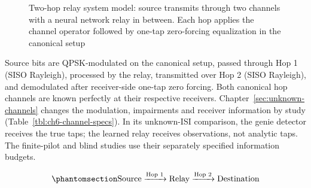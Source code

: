 \begin{figure}[htbp]
\centering
{}
\caption[Two-hop relay system model]{Two-hop relay system model: source transmits through two channels with a neural network relay in between. Each hop applies the channel operator followed by one-tap zero-forcing equalization in the canonical setup}
\label{fig:relay-system-simple}
\end{figure}

Source bits are QPSK-modulated on the canonical setup, passed through Hop 1 (SISO Rayleigh), processed by the relay, transmitted over Hop 2 (SISO Rayleigh), and demodulated after receiver-side one-tap zero forcing. Both canonical hop channels are known perfectly at their respective receivers. Chapter~\ref{sec:unknown-channels} changes the modulation, impairments and receiver information by study (Table~\ref{tbl:ch6-channel-specs}). In its unknown-ISI comparison, the genie detector receives the true taps; the learned relay receives observations, not analytic taps. The finite-pilot and blind studies use their separately specified information budgets.

\begin{equation}\protect\phantomsection\label{eq:two-hop-system}{\text{Source} \xrightarrow{\text{Hop 1}} \text{Relay} \xrightarrow{\text{Hop 2}} \text{Destination}
}\end{equation}

